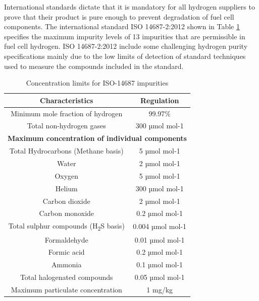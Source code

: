 International standards dictate that it is mandatory for all hydrogen suppliers to prove that their 
product is pure enough to prevent degradation of fuel cell components. The international standard ISO
14687-2:2012 \cite{InternationalStandardISO14687-2:20122012} shown in Table \ref{tab:1} specifies the 
maximum impurity levels of 13 impurities that are 
permissible in fuel cell hydrogen. ISO 14687-2:2012 include some challenging hydrogen purity 
specifications mainly due to the low limits of detection of standard techniques used to measure the 
compounds included in the standard. 

\begin{table}[]
    \caption{Concentration limits for ISO-14687 impurities}
    \centering
    \begin{tabular}{@{}cc@{}}
    \toprule
    \textbf{Characteristics}                  & \textbf{Regulation}    \\ \midrule
    Minimum mole fraction of hydrogen         & 99.97\%                \\
    Total non-hydrogen gases                  & 300 µmol mol-1         \\ \midrule
    \multicolumn{2}{c}{\textbf{Maximum concentration of individual components}} \\ \midrule
    Total Hydrocarbons (Methane basis)        & 5 µmol mol-1           \\
    Water                                     & 2 µmol mol-1           \\
    Oxygen                                    & 5 µmol mol-1           \\
    Helium                                    & 300 µmol mol-1         \\
    Carbon dioxide                            & 2 µmol mol-1           \\
    Carbon monoxide                           & 0.2 µmol mol-1         \\
    Total sulphur compounds (H\textsubscript{2}S basis)       & 0.004 µmol mol-1       \\
    Formaldehyde                              & 0.01 µmol mol-1        \\
    Formic acid                               & 0.2 µmol mol-1         \\
    Ammonia                                   & 0.1 µmol mol-1         \\
    Total halogenated compounds               & 0.05 µmol mol-1        \\
    Maximum particulate concentration         & 1 mg/kg                \\ \bottomrule
    \end{tabular}
    \label{tab:1}
\end{table}

